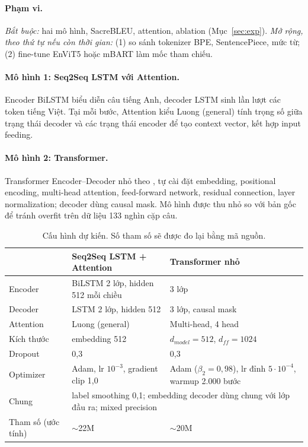 \documentclass[11pt,a4paper]{article}
\begin{document}
\paragraph{Phạm vi.} \emph{Bắt buộc:} hai mô hình,
SacreBLEU, attention, ablation (Mục~\ref{sec:exp}).
\emph{Mở rộng, theo thứ tự nếu còn thời gian:}
(1) so sánh tokenizer BPE, SentencePiece, mức từ;
(2) fine-tune EnViT5 hoặc mBART làm mốc tham chiếu.

\paragraph{Mô hình 1: Seq2Seq LSTM với Attention.}
Encoder BiLSTM biểu diễn câu tiếng Anh, decoder LSTM
sinh lần lượt các token tiếng Việt. Tại mỗi bước, Attention
kiểu Luong (general) tính trọng số giữa trạng thái decoder
và các trạng thái encoder để tạo context vector, kết hợp
input feeding.

\paragraph{Mô hình 2: Transformer.}
Transformer Encoder--Decoder nhỏ theo
\citet{vaswani2017attention}, tự cài đặt embedding,
positional encoding, multi-head attention, feed-forward
network, residual connection, layer normalization;
decoder dùng causal mask. Mô hình được thu nhỏ so với
bản gốc để tránh overfit trên dữ liệu 133 nghìn cặp câu.

\begin{table}[t]
\centering
\footnotesize
\begin{tabular}{lll}
\hline
& \textbf{Seq2Seq LSTM + Attention} & \textbf{Transformer nhỏ} \\
\hline
Encoder & BiLSTM 2 lớp, hidden 512 mỗi chiều & 3 lớp \\
Decoder & LSTM 2 lớp, hidden 512 & 3 lớp, causal mask \\
Attention & Luong (general) & Multi-head, 4 head \\
Kích thước & embedding 512 & $d_{model}=512$, $d_{ff}=1024$ \\
Dropout & 0,3 & 0,3 \\
Optimizer & Adam, lr $10^{-3}$, gradient clip 1,0 &
Adam ($\beta_2=0{,}98$), lr đỉnh $5\cdot10^{-4}$, warmup 2.000 bước \\
Chung & \multicolumn{2}{l}{label smoothing 0,1; embedding decoder dùng chung với lớp đầu ra; mixed precision} \\
Tham số (ước tính) & $\sim$22M & $\sim$20M \\
\hline
\end{tabular}
\caption{Cấu hình dự kiến. Số tham số sẽ được đo lại bằng mã nguồn.}
\label{tab:config}
\end{table}
\end{document}
